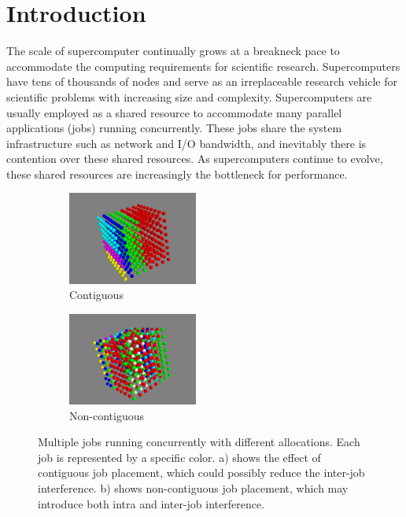 
\section{Introduction} 
\label{sec: intro}

The scale of supercomputer continually grows at a breakneck pace to 
accommodate the computing requirements for scientific research. 
Supercomputers have tens of thousands of nodes and serve as an irreplaceable 
research vehicle for scientific problems with increasing size and complexity. 
Supercomputers are usually employed as a shared resource to 
accommodate many parallel applications (jobs) running concurrently. 
These jobs share the system infrastructure such as network and I/O bandwidth, 
and inevitably there is contention over these shared resources. 
As supercomputers continue to evolve, these shared resources are increasingly the bottleneck for performance.


\begin{figure}[h!]
    \centering
    \begin{subfigure}[t]{0.22\textwidth}
        \centering
        \includegraphics[height=1.2in]{figs/goodallocation}
        \caption{Contiguous}
        \label{fig:overview_sub1}
    \end{subfigure}%
    \hspace{1em}%
    \begin{subfigure}[t]{0.22\textwidth}
        \centering
        \includegraphics[height=1.2in]{figs/badallocation}
        \caption{Non-contiguous}
        \label{fig:overview_sub2}
    \end{subfigure}%
   \caption{Multiple jobs running concurrently with different allocations. 
   Each job is represented by a specific color. 
   a) shows the effect of contiguous job placement, 
   which could possibly reduce the inter-job interference. 
   b) shows non-contiguous job placement, 
   which may introduce both intra and inter-job interference. 
   }
   \label{fig:overview}
\end{figure}


